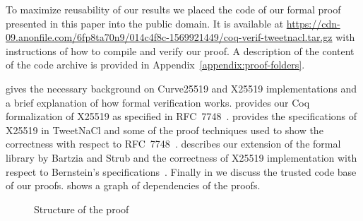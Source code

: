 

To maximize reusability of our results we placed the code of our formal proof
presented in this paper into the public domain.
It is available at \url{https://cdn-09.anonfile.com/6fp8ta70n9/014c4f8c-1569921449/coq-verif-tweetnacl.tar.gz}
with instructions of how to compile and verify our proof.
A description of the content of the code archive is provided in
Appendix~\ref{appendix:proof-folders}.

 gives the necessary background on Curve25519 and X25519
implementations and a brief explanation of how formal verification works.
 provides our Coq formalization of X25519 as specified in RFC~7748~\cite{rfc7748}.
 provides the specifications of X25519 in TweetNaCl and some of the
proof techniques used to show the correctness with respect to RFC~7748~\cite{rfc7748}.
 describes our extension of the formal library by Bartzia
and Strub and the correctness of X25519 implementation with respect to Bernstein's
specifications~\cite{Ber14}.
Finally in  we discuss the trusted code base of our proofs.
 shows a graph of dependencies of the proofs.

\begin{figure}[h]
  \centering
  
  \caption{Structure of the proof}
  \label{tikz:ProofOverview}
\end{figure}



